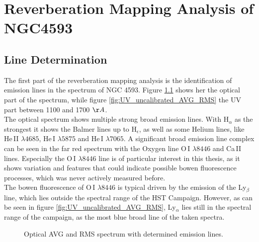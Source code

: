 \chapter{Reverberation Mapping Analysis of NGC4593}
\label{cap: Results}

\section{Line Determination}

 The first part of the reverberation mapping analysis is the identification of emission lines in the spectrum of NGC 4593. Figure \ref{fig:AVG_RMS_SPECTRUM} shows her the optical part of the spectrum, while figure \ref{fig:UV_uncalibrated_AVG_RMS} the UV part between 1100 and 1700 $\AA$. \\
 The optical spectrum shows multiple strong broad emission lines. With H$_\alpha$ as the strongest it shows the Balmer lines up to H$_\epsilon$, as well as some Helium lines, like He\,II $\lambda 4685$, He\,I $\lambda 5875$ and He\,I $\lambda 7065$. A significant broad emission line complex can be seen in the far red spectrum with the Oxygen line O\,I $\lambda 8446$ and Ca\,II lines. Especially the O\,I $\lambda 8446$ line is of particular interest in this thesis, as it shows variation and features that could indicate possible bowen fluorescence processes, which was never actively measured before.\\
 The bowen fluorescence of O\,I $\lambda 8446$ is typical driven by the emission of the Ly$_\beta$ line, which lies outside the spectral range of the HST Campaign. However, as can be seen in figure \ref{fig:UV_uncalibrated_AVG_RMS}, Ly$_\alpha$ lies still in the spectral range of the campaign, as the most blue broad line of the taken spectra. 
 
 
\begin{figure}[!htbp]
	\centering
	\caption{Optical AVG and RMS spectrum with determined emission lines.}
	\label{fig:AVG_RMS_SPECTRUM}
\end{figure}

